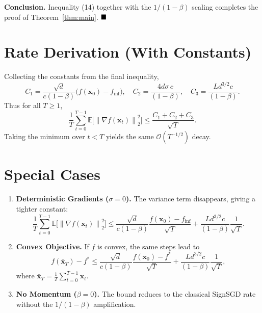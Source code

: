 \documentclass[11pt]{article}
\newcommand{\E}{\mathbb{E}}
\newcommand{\norm}[1]{\left\lVert#1\right\rVert}
\begin{document}
\noindent\textbf{Conclusion.}  
Inequality (14) together with the $1/(1-\beta)$ scaling completes the proof of Theorem~\ref{thm:main}. $\hfill\blacksquare$

\section*{Rate Derivation (With Constants)}
Collecting the constants from the final inequality,
\[
C_{1}= \frac{\sqrt{d}}{c(1-\beta)}\bigl(f(\bm{x}_{0})-f_{\inf}\bigr),\quad
C_{2}= \frac{4d\sigma\,c}{(1-\beta)},\quad
C_{3}= \frac{L d^{3/2}c}{(1-\beta)}.
\]
Thus for all $T\ge1$,
\[
\frac{1}{T}\sum_{t=0}^{T-1}\E\!\big[\norm{\nabla f(\bm{x}_{t})}_{2}^{2}\big]
\le \frac{C_{1}+C_{2}+C_{3}}{\sqrt{T}}.
\]
Taking the minimum over $t<T$ yields the same $\mathcal{O}(T^{-1/2})$ decay.

\section*{Special Cases}
\begin{enumerate}[label=(\alph*),noitemsep]
    \item \textbf{Deterministic Gradients ($\sigma=0$).}  
    The variance term disappears, giving a tighter constant:
    \[
    \frac{1}{T}\sum_{t=0}^{T-1}\E\!\big[\norm{\nabla f(\bm{x}_{t})}_{2}^{2}\big]
    \le\frac{\sqrt{d}}{c(1-\beta)}\frac{f(\bm{x}_{0})-f_{\inf}}{\sqrt{T}}
    +\frac{L d^{3/2}c}{(1-\beta)}\frac{1}{\sqrt{T}}.
    \]
    \item \textbf{Convex Objective.}  
    If $f$ is convex, the same steps lead to
    \[
    f(\bar{\bm{x}}_{T})-f^{*}\le
    \frac{\sqrt{d}}{c(1-\beta)}\frac{f(\bm{x}_{0})-f^{*}}{\sqrt{T}}
    +\frac{L d^{3/2}c}{(1-\beta)}\frac{1}{\sqrt{T}} ,
    \]
    where $\bar{\bm{x}}_{T}=\frac{1}{T}\sum_{t=0}^{T-1}\bm{x}_{t}$.
    \item \textbf{No Momentum ($\beta=0$).}  
    The bound reduces to the classical SignSGD rate without the $1/(1-\beta)$ amplification.
\end{enumerate}
\end{document}

